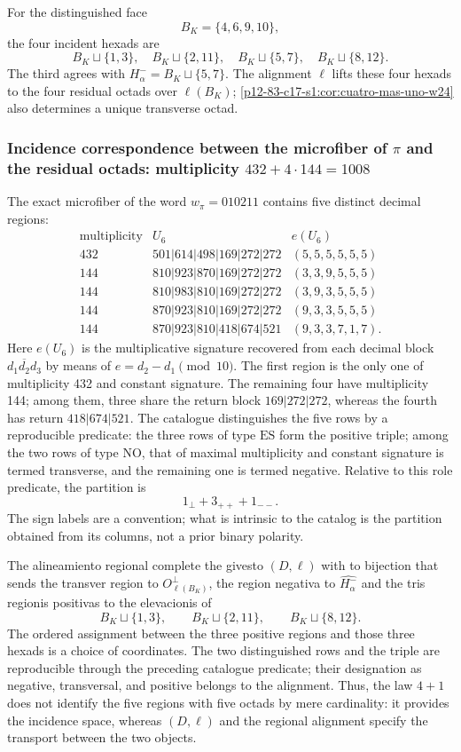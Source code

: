 For the distinguished face
\[
 B_K=\{4,6,9,10\},
\]
the four incident hexads are
\[
 B_K\sqcup\{1,3\},\quad
 B_K\sqcup\{2,11\},\quad
 B_K\sqcup\{5,7\},\quad
 B_K\sqcup\{8,12\}.
\]
The third agrees with
\(H_\alpha^-=B_K\sqcup\{5,7\}\). The alignment \(\ell\) lifts these
four hexads to the four residual octads over \(\ell(B_K)\);
\cref{p12-83-c17-s1:cor:cuatro-mas-uno-w24} also determines a unique transverse octad.

\subsubsection{Incidence correspondence between the microfiber of \texorpdfstring{\(\pi\)}{pi} and the residual octads: multiplicity \texorpdfstring{\(432+4\cdot144=1008\)}{432+4x144=1008}}

The exact microfiber of the word
\(w_\pi=010211\) contains five distinct decimal regions:
\[
\begin{array}{c|c|c}
\text{multiplicity}&U_6& e(U_6)\\
\hline
432&501|614|498|169|272|272&(5,5,5,5,5,5)\\
144&810|923|870|169|272|272&(3,3,9,5,5,5)\\
144&810|983|810|169|272|272&(3,9,3,5,5,5)\\
144&870|923|810|169|272|272&(9,3,3,5,5,5)\\
144&870|923|810|418|674|521&(9,3,3,7,1,7).
\end{array}
\]
Here \(e(U_6)\) is the multiplicative signature recovered from each
decimal block \(\overline{d_1d_2d_3}\) by means of
\(e=d_2-d_1\pmod {10}\). The first region is the only one of multiplicity
432 and constant signature. The remaining four have multiplicity 144; among
them, three share the return block \(169|272|272\), whereas the
fourth has return \(418|674|521\). The catalogue distinguishes the five
rows by a reproducible predicate: the three rows of type
\(\mathrm{ES}\) form the positive triple; among the two rows of type
\(\mathrm{NO}\), that of maximal multiplicity and constant signature is termed
transverse, and the remaining one is termed negative. Relative to this role
predicate, the partition is
\[
 \boxed{1_\perp+3_{++}+1_{--}.}
\]
The sign labels are a convention; what is intrinsic to the catalog is the
partition obtained from its columns, not a prior binary polarity.

The alineamiento regional complete the givesto \((D,\ell)\) with to bijection
that sends the transver region to \(O_{\ell(B_K)}^\perp\), the region
negativa to \(\widehat{H_\alpha^-}\) and the tris regionis positivas to the
elevacionis of
\[
 B_K\sqcup\{1,3\},\qquad
 B_K\sqcup\{2,11\},\qquad
 B_K\sqcup\{8,12\}.
\]
The ordered assignment between the three positive regions and those three hexads is a choice of coordinates. The two distinguished rows and the triple are reproducible through the preceding catalogue predicate; their designation as negative, transversal, and positive belongs to the alignment. Thus, the law \(4+1\) does not identify the five regions with five octads by mere cardinality: it provides the incidence space, whereas \((D,\ell)\) and the regional alignment specify the transport between the two objects.


